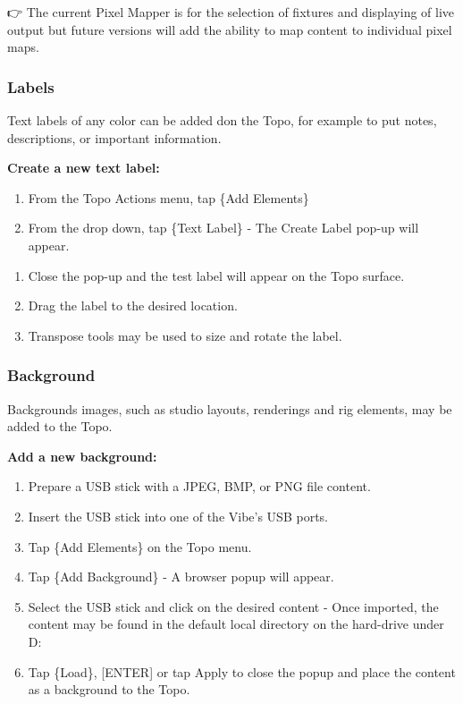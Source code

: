 \documentclass[
]{article}
\begin{document}
👉 The current Pixel Mapper is for the selection of fixtures and displaying of live output but future versions will add the ability to map content to individual pixel maps.

\hypertarget{labels}{%
\subsubsection{Labels}\label{labels}}

Text labels of any color can be added don the Topo, for example to put notes, descriptions, or important information.

\textbf{Create a new text label:}

\begin{enumerate}
\def\labelenumi{\arabic{enumi}.}
\item
  From the Topo Actions menu, tap \{Add Elements\}
\item
  From the drop down, tap \{Text Label\} - The Create Label pop-up will appear.
\end{enumerate}

\begin{enumerate}
\def\labelenumi{\arabic{enumi}.}
\setcounter{enumi}{2}
\item
  Close the pop-up and the test label will appear on the Topo surface.
\item
  Drag the label to the desired location.
\item
  Transpose tools may be used to size and rotate the label.
\end{enumerate}

\hypertarget{background}{%
\subsubsection{Background}\label{background}}

Backgrounds images, such as studio layouts, renderings and rig elements, may be added to the Topo.

\textbf{Add a new background:}

\begin{enumerate}
\def\labelenumi{\arabic{enumi}.}
\item
  Prepare a USB stick with a JPEG, BMP, or PNG file content.
\item
  Insert the USB stick into one of the Vibe's USB ports.
\item
  Tap \{Add Elements\} on the Topo menu.
\item
  Tap \{Add Background\} - A browser popup will appear.
\item
  Select the USB stick and click on the desired content - Once imported, the content may be found in the default local directory on the hard-drive under D:\Vibe\Compulite\WorkDir\show\Images\Topo\\
\item
  Tap \{Load\}, {[}ENTER{]} or tap Apply to close the popup and place the content as a background to the Topo.
\end{enumerate}
\end{document}
